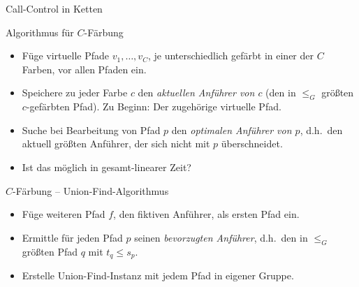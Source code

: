 \begin{section}{Call-Control in Ketten}
\begin{frame}{Algorithmus für $C$-Färbung}
		
	\begin{itemize}
		\pause\item Füge virtuelle Pfade $v_1,\dots,v_C$, je unterschiedlich gefärbt in einer der $C$ Farben, vor allen Pfaden ein.
		\pause\item Speichere zu jeder Farbe $c$ den {\em aktuellen Anführer von $c$} (den in $\leq_G$ größten $c$-gefärbten Pfad). Zu Beginn: Der zugehörige virtuelle Pfad.
		\begin{figure}[htbp]
			\centering
			\tiny
			\def\svgwidth{200bp}
			
		\end{figure}
		\pause\item Suche bei Bearbeitung von Pfad $p$ den {\em optimalen Anführer von $p$}, d.h.\ den aktuell größten Anführer, der sich nicht mit $p$ überschneidet.
		\pause\item Ist das möglich in gesamt-linearer Zeit?
	\end{itemize}

\end{frame}

\begin{frame}{$C$-Färbung -- Union-Find-Algorithmus}
	\begin{itemize}
		\pause\item Füge weiteren Pfad $f$, den fiktiven Anführer, als ersten Pfad ein.
		\pause\item Ermittle für jeden Pfad $p$ seinen {\em bevorzugten Anführer}, d.h.\ den in $\leq_G$ größten Pfad $q$ mit $t_q \leq s_p$.
		\pause\begin{figure}[htbp]
			\centering
			\small
			\def\svgwidth{180bp}
			
		\end{figure}
		\pause\item Erstelle Union-Find-Instanz mit jedem Pfad in eigener Gruppe.
	\end{itemize}
\end{frame}


\end{section}

